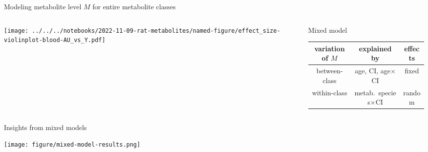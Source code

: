 \documentclass[aspectratio=169]{beamer}
\begin{document}
\begin{frame}{Modeling metabolite level $M$ for entire metabolite classes}
\begin{columns}[t]
\begin{column}{0.5\textwidth}
  
\texttt{[image: ../../../notebooks/2022-11-09-rat-metabolites/named-figure/effect\_size-violinplot-blood-AU\_vs\_Y.pdf]}
\end{column}

\begin{column}{0.5\textwidth}
\begin{center}
  Mixed model
\end{center}

\begin{tabular}{c|c|c}
  variation of $M$ & explained by & effects \\
  \hline
  between-class & age, CI, age$\times$CI & fixed \\
  within-class & metab.~species$\times$CI & random \\
\end{tabular}

\end{column}
\end{columns}
\end{frame}

\begin{frame}{Insights from mixed models}
\begin{center}
\texttt{[image: figure/mixed-model-results.png]}
\end{center}
\end{frame}
\end{document}
